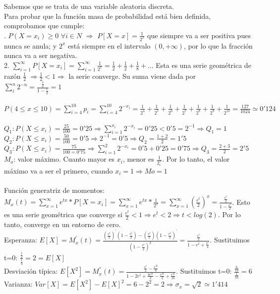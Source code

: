 \problem 
Sabemos que se trata de una variable aleatoria discreta. \\
Para probar que la función masa de probabilidad está bien definida, comprobamos que cumple: \\
. $P(X=x_i)\geq 0$ $\forall i\in N$ $\Rightarrow$ $P[X=x]=\frac{1}{2^x}$ que siempre va a ser positiva pues nunca se anula; y $2^x$ está siempre en el intervalo $(0,+\infty)$, por lo que la fracción nunca va a ser negativa. \\
2. $\sum_{i=1}^{\infty}P[X=x_i]=\sum_{i=1}^{\infty}\frac{1}{2^x} = \frac{1}{2} + \frac{1}{2} + \frac{1}{8} + ... $ Esta es una serie geométrica de razón $\frac{1}{2}$ $\Rightarrow \frac{1}{2} < 1 \Rightarrow$ la serie converge. Su suma viene dada por $\sum_{i}^n 2^{-n} = \frac{\frac{1}{2}}{1-\frac{1}{2}}=1$ \\ \\
\subproblem
$P(4\leq x \leq 10) = \sum^{10}_{i=4} p_i = \sum^{10}_{i=4} 2^{-x_i} = \frac{1}{2^4}+\frac{1}{2^5}+ \frac{1}{2^6} + \frac{1}{2^7} + \frac{1}{2^8} + \frac{1}{2^9}+ \frac{1}{2^{10}} = \frac{127}{1024} \simeq 0'124$ \\ \\
\subproblem
$Q_1: P(X\leq x_i) = \frac{25}{100} = 0'25 \Rightarrow \sum^{x_i}_{i=1} 2^{-x_i} = 0'25 < 0'5 = 2^{-1} \Rightarrow Q_1 = 1$ \\
$Q_2: P(X \leq x_i) = \frac{50}{100} = 0'5 \Rightarrow 2^{-1} = 0'5 \Rightarrow Q_2 = \frac{1+2}{2} = 1'5$ \\
$Q_3: P(X \leq x_i) = \frac{75}{100 = 0'75} \Rightarrow \sum^2_{i=1} 2^{-x_i} = 0'5 + 0'25 = 0'75 \Rightarrow Q_3 = \frac{2+3}{2} = 2'5$ \\
$M_o$: valor máximo. Cuanto mayor es $x_i$, menor es $\frac{1}{2^x_i}$. Por lo tanto, el valor máximo va a ser el primero, cuando $x_i = 1 \Rightarrow Mo = 1$ \\ \\
\subproblem
Función generatriz de momentos: $M_x(t) = \sum^\infty_{x=1} e^{tx}*P[X=x_i] = \sum^\infty_{x=1} e^{tx}*\frac{1}{2^x} = \sum^\infty_{x=1} (\frac{e^t}{2})^x = \frac{\frac{e^t}{2}}{1-\frac{e^t}{2}}$. Esto es una serie geométrica que converge si $\frac{e^t}{2} < 1 \Rightarrow e^t < 2 \Rightarrow t < log(2)$. Por lo tanto, converge en un entorno de cero. \\
Esperanza: $E[X] = M^{'} _x(t) = \frac{(\frac{e^t}{2})^{'}(1-\frac{e^t}{2})-(\frac{e^t}{2})(1-\frac{e^t}{2})^{'}}{(1-\frac{e^t}{2})^2} = \frac{\frac{e^t}{2}}{1 - e^t + \frac{e^t}{4}}$. Sustituimos t=0: $\frac{\frac{1}{2}}{\frac{1}{4}} = 2 = E[X]$ \\
Desviación típica: $E[X^2] = M^{''}_x(t) = \frac{\frac{e^t}{2}-\frac{e^{3t}}{8}}{1-2e^t+\frac{3e^{2t}}{2}-\frac{e^{3t}}{2}+\frac{e^{4t}}{16}}$. Sustituimos t=0: $\frac{\frac{6}{16}}{\frac{1}{16}} = 6$ \\
Varianza: $Var[X] = E[X^2]-E[X]^2 = 6-2^2 = 2 \Rightarrow \sigma_x = \sqrt{2} \simeq 1'414$

